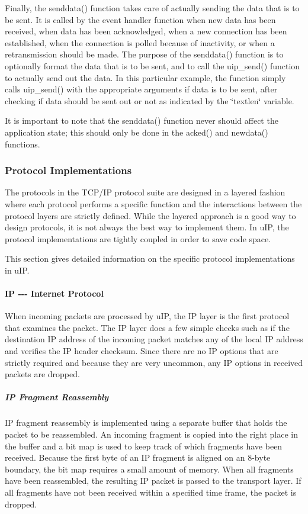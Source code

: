 Finally, the senddata() function takes care of actually sending the data that is to be sent. It is called by the event handler function when new data has been received, when data has been acknowledged, when a new connection has been established, when the connection is polled because of inactivity, or when a retransmission should be made. The purpose of the senddata() function is to optionally format the data that is to be sent, and to call the uip\+\_\+send() function to actually send out the data. In this particular example, the function simply calls uip\+\_\+send() with the appropriate arguments if data is to be sent, after checking if data should be sent out or not as indicated by the \char`\"{}textlen\char`\"{} variable.

It is important to note that the senddata() function never should affect the application state; this should only be done in the acked() and newdata() functions.\hypertarget{a00074_protoimpl}{}\subsubsection{Protocol Implementations}\label{a00074_protoimpl}
The protocols in the T\+C\+P/\+IP protocol suite are designed in a layered fashion where each protocol performs a specific function and the interactions between the protocol layers are strictly defined. While the layered approach is a good way to design protocols, it is not always the best way to implement them. In u\+IP, the protocol implementations are tightly coupled in order to save code space.

This section gives detailed information on the specific protocol implementations in u\+IP.\hypertarget{a00074_ip}{}\paragraph{I\+P -\/-\/-\/ Internet Protocol}\label{a00074_ip}
When incoming packets are processed by u\+IP, the IP layer is the first protocol that examines the packet. The IP layer does a few simple checks such as if the destination IP address of the incoming packet matches any of the local IP address and verifies the IP header checksum. Since there are no IP options that are strictly required and because they are very uncommon, any IP options in received packets are dropped.\hypertarget{a00074_ipreass}{}\subparagraph{I\+P Fragment Reassembly}\label{a00074_ipreass}
IP fragment reassembly is implemented using a separate buffer that holds the packet to be reassembled. An incoming fragment is copied into the right place in the buffer and a bit map is used to keep track of which fragments have been received. Because the first byte of an IP fragment is aligned on an 8-\/byte boundary, the bit map requires a small amount of memory. When all fragments have been reassembled, the resulting IP packet is passed to the transport layer. If all fragments have not been received within a specified time frame, the packet is dropped.

